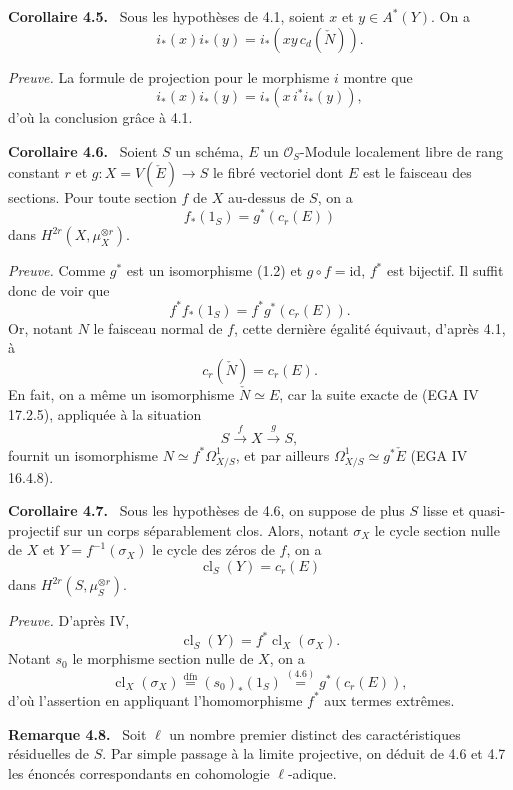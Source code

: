 \documentclass[11pt]{article}
\newenvironment{statement}[1]{\par\medskip\noindent\textbf{#1.}\ }{\par\medskip}
\providecommand{\cl}{\operatorname{cl}}
\providecommand{\cl}{\operatorname{cl}}
\providecommand{\cl}{\operatorname{cl}}
\begin{document}
\begin{statement}{Corollaire 4.5}
Sous les hypothèses de 4.1, soient $x$ et $y\in A^*(Y)$. On a
\[
i_*(x)i_*(y)=i_*(xy\,c_d(\check N)).
\]
\end{statement}

\emph{Preuve.} La formule de projection pour le morphisme $i$ montre que
\[
i_*(x)i_*(y)=i_*(x\,i^*i_*(y)),
\]
d'où la conclusion grâce à 4.1.

\begin{statement}{Corollaire 4.6}
Soient $S$ un schéma, $E$ un $\mathcal O_S$-Module localement libre de rang constant $r$ et $g:X=V(\check E)\to S$ le fibré vectoriel dont $E$ est le faisceau des sections. Pour toute section $f$ de $X$ au-dessus de $S$, on a
\[
f_*(1_S)=g^*(c_r(E))
\]
dans $H^{2r}(X,\mu_X^{\otimes r})$.
\end{statement}

\emph{Preuve.} Comme $g^*$ est un isomorphisme (1.2) et $g\circ f=\mathrm{id}$, $f^*$ est bijectif. Il suffit donc de voir que
\[
f^*f_*(1_S)=f^*g^*(c_r(E)).
\]
Or, notant $N$ le faisceau normal de $f$, cette dernière égalité équivaut, d'après 4.1, à
\[
c_r(\check N)=c_r(E).
\]
En fait, on a même un isomorphisme $\check N\simeq E$, car la suite exacte de (EGA IV 17.2.5), appliquée à la situation
\[
S\xrightarrow{f} X\xrightarrow{g} S,
\]
fournit un isomorphisme $N\simeq f^*\Omega^1_{X/S}$, et par ailleurs $\Omega^1_{X/S}\simeq g^*\check E$ (EGA IV 16.4.8).

\begin{statement}{Corollaire 4.7}
Sous les hypothèses de 4.6, on suppose de plus $S$ lisse et quasi-projectif sur un corps séparablement clos. Alors, notant $\sigma_X$ le cycle section nulle de $X$ et $Y=f^{-1}(\sigma_X)$ le cycle des zéros de $f$, on a
\[
\cl_S(Y)=c_r(E)
\]
dans $H^{2r}(S,\mu_S^{\otimes r})$.
\end{statement}

\emph{Preuve.} D'après IV,
\[
\cl_S(Y)=f^*\cl_X(\sigma_X).
\]
Notant $s_0$ le morphisme section nulle de $X$, on a
\[
\cl_X(\sigma_X)\stackrel{\mathrm{dfn}}{=}(s_0)_*(1_S)\stackrel{(4.6)}{=}g^*(c_r(E)),
\]
d'où l'assertion en appliquant l'homomorphisme $f^*$ aux termes extrêmes.

\begin{statement}{Remarque 4.8}
Soit $\ell$ un nombre premier distinct des caractéristiques résiduelles de $S$. Par simple passage à la limite projective, on déduit de 4.6 et 4.7 les énoncés correspondants en cohomologie $\ell$-adique.
\end{statement}
\end{document}
